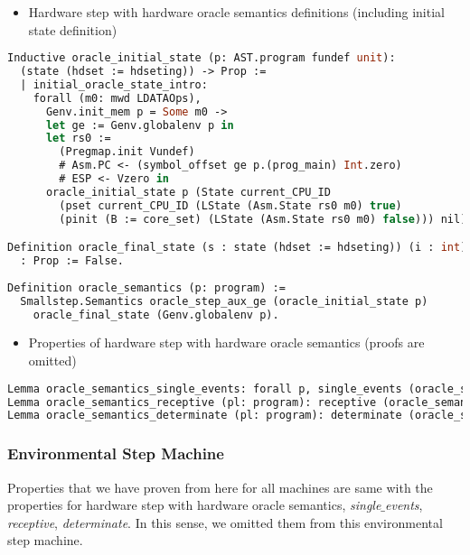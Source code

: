 \begin{itemize}[leftmargin=*]
\item Hardware step with hardware oracle semantics definitions (including initial state definition)
\end{itemize}
\begin{lstlisting}[language=Caml]
Inductive oracle_initial_state (p: AST.program fundef unit): 
  (state (hdset := hdseting)) -> Prop := 
  | initial_oracle_state_intro: 
    forall (m0: mwd LDATAOps),
      Genv.init_mem p = Some m0 ->
      let ge := Genv.globalenv p in
      let rs0 :=
        (Pregmap.init Vundef)
        # Asm.PC <- (symbol_offset ge p.(prog_main) Int.zero)
        # ESP <- Vzero in
      oracle_initial_state p (State current_CPU_ID 
        (pset current_CPU_ID (LState (Asm.State rs0 m0) true)
        (pinit (B := core_set) (LState (Asm.State rs0 m0) false))) nil).

Definition oracle_final_state (s : state (hdset := hdseting)) (i : int)
  : Prop := False.
      
Definition oracle_semantics (p: program) :=
  Smallstep.Semantics oracle_step_aux_ge (oracle_initial_state p) 
    oracle_final_state (Genv.globalenv p). 
\end{lstlisting}

\begin{itemize}[leftmargin=*]
\item Properties of hardware step with hardware oracle semantics (proofs are omitted)
\end{itemize}
\begin{lstlisting}[language=Caml]
Lemma oracle_semantics_single_events: forall p, single_events (oracle_semantics p).
Lemma oracle_semantics_receptive (pl: program): receptive (oracle_semantics pl).
Lemma oracle_semantics_determinate (pl: program): determinate (oracle_semantics pl).
\end{lstlisting}

\subsubsection{Environmental Step Machine}

Properties that we have proven from here for all machines are same with the properties for  hardware step with hardware oracle semantics,
\textit{single$\_$events}, \textit{receptive}, \textit{determinate}. 
In this sense, we omitted them from this environmental step machine.

